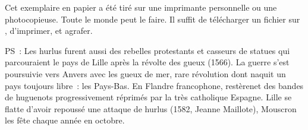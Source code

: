 \documentclass[french,twoside]{book} %
\newif\ifdev
\renewcommand{\LettrineFontHook}{\color{rubric}}
\newcommand{\initialiv}[2]{%
  \let\oldLFH\LettrineFontHook
  \IfSubStr{QJ’}{#1}{
    \lettrine[lines=4, lhang=0.2, loversize=-0.1, lraise=0.2]{\smash{#1}}{#2}
  }{\IfSubStr{É}{#1}{
    \lettrine[lines=4, lhang=0.2, loversize=-0, lraise=0]{\smash{#1}}{#2}
  }{\IfSubStr{ÀÂ}{#1}{
    \lettrine[lines=4, lhang=0.2, loversize=-0, lraise=0, slope=0.6em]{\smash{#1}}{#2}
  }{\IfSubStr{A}{#1}{
    \lettrine[lines=4, lhang=0.2, loversize=0.2, slope=0.6em]{\smash{#1}}{#2}
  }{\IfSubStr{V}{#1}{
    \lettrine[lines=4, lhang=0.2, loversize=0.2, slope=-0.5em]{\smash{#1}}{#2}
  }{
    \lettrine[lines=4, lhang=0.2, loversize=0.2]{\smash{#1}}{#2}
  }}}}}
  \let\LettrineFontHook\oldLFH
}
\renewcommand{\LettrineFontHook}{\bfseries\color{rubric}}
\begin{document}
  Cet exemplaire en papier a été tiré sur une imprimante personnelle
   ou une photocopieuse. Toute le monde peut le faire.
  Il suffit de
  télécharger un fichier sur \href{https://hurlus.fr}{},
  d’imprimer, et agrafer.\par

  \bigskip

  \noindent PS : Les hurlus furent aussi des rebelles protestants et casseurs de statues qui parcouraient le pays de Lille après la révolte des gueux (1566). La guerre s’est poursuivie vers Anvers avec les gueux de mer, rare révolution dont naquit un pays toujours libre : les Pays-Bas.
  En Flandre francophone, restèrenet des bandes de huguenots progressivement réprimés par la très catholique Espagne.
  Lille se flatte d’avoir repoussé une attaque de hurlus (1582, Jeanne Maillote), Mouscron les fête chaque année en octobre.
\fi

\ifdev %
\fontname\font — \textsc{Les règles du jeu}\par
(\hyperref[utopie]{\underline{Lien}})\par
\noindent \initialiv{A}{lors là}\blindtext\par
\noindent \initialiv{À}{ la bonheur des dames}\blindtext\par
\noindent \initialiv{É}{tonnez-le}\blindtext\par
\noindent \initialiv{Q}{ualitativement}\blindtext\par
\noindent \initialiv{V}{aloriser}\blindtext\par
\Blindtext
\phantomsection
\label{utopie}
\Blinddocument
\fi
\end{document}
